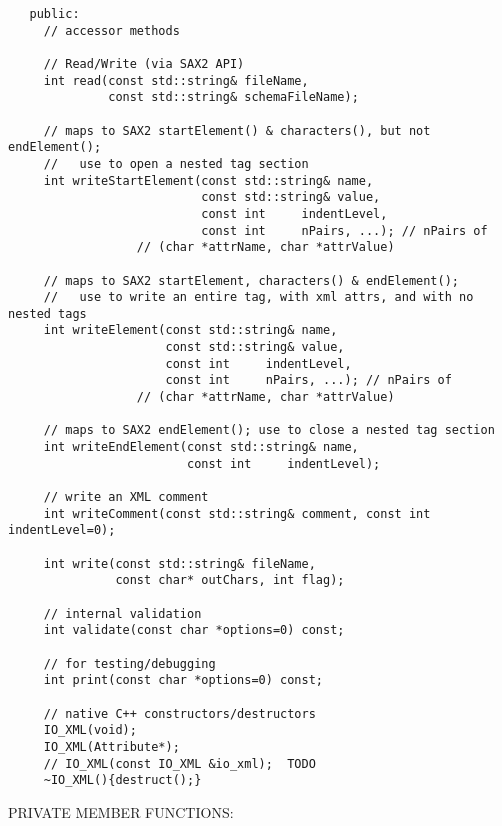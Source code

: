 \begin{verbatim} 
   public:
     // accessor methods
 
     // Read/Write (via SAX2 API)
     int read(const std::string& fileName,
              const std::string& schemaFileName);
 
     // maps to SAX2 startElement() & characters(), but not endElement();
     //   use to open a nested tag section
     int writeStartElement(const std::string& name,
                           const std::string& value,
                           const int     indentLevel,
                           const int     nPairs, ...); // nPairs of
                  // (char *attrName, char *attrValue)
 
     // maps to SAX2 startElement, characters() & endElement();
     //   use to write an entire tag, with xml attrs, and with no nested tags
     int writeElement(const std::string& name,
                      const std::string& value,
                      const int     indentLevel,
                      const int     nPairs, ...); // nPairs of
                  // (char *attrName, char *attrValue)
 
     // maps to SAX2 endElement(); use to close a nested tag section
     int writeEndElement(const std::string& name,
                         const int     indentLevel);
 
     // write an XML comment
     int writeComment(const std::string& comment, const int indentLevel=0);
 
     int write(const std::string& fileName,
               const char* outChars, int flag);
 
     // internal validation
     int validate(const char *options=0) const;
 
     // for testing/debugging
     int print(const char *options=0) const;
 
     // native C++ constructors/destructors
     IO_XML(void);
     IO_XML(Attribute*);
     // IO_XML(const IO_XML &io_xml);  TODO
     ~IO_XML(){destruct();}
 \end{verbatim}{\sf PRIVATE MEMBER FUNCTIONS:}
